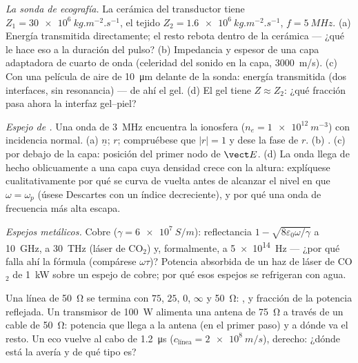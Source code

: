 \begin{exercise}[$\star\star$]\label{exo:b2:wave-interfaces:6}
\emph{La sonda de ecografía.} La cerámica del transductor tiene $Z_1 = \qty{30e6}{kg.m^{-2}.s^{-1}}$,
el tejido $Z_2 = \qty{1.6e6}{kg.m^{-2}.s^{-1}}$, $f = \qty{5}{MHz}$. (a) Energía
transmitida directamente; el resto rebota dentro de la cerámica --- ¿qué
le hace eso a la duración del pulso? (b) Impedancia y espesor de una
capa adaptadora de cuarto de onda (celeridad del sonido en la capa, \qty{3000}{m/s}).
(c) Con una película de aire de \qty{10}{\micro m} delante de la sonda: energía
transmitida (dos interfaces, sin resonancia) --- de ahí el gel. (d) El
gel tiene $Z \approx Z_2$: ¿qué fracción pasa ahora la interfaz gel--piel?
\end{exercise}

\begin{exercise}[$\star\star$]\label{exo:b2:wave-interfaces:7}
\emph{Espejo de .} Una onda de \qty{3}{MHz} encuentra la ionosfera ($n_e =
\qty{1e12}{m^{-3}}$) con incidencia normal. (a) $\underline n$; $r$; compruébese que $|r| = 1$ y
dese la fase de $r$. (b) . (c)  por debajo de la
capa: posición del primer nodo de $\vect E$. (d) La onda llega de hecho
oblicuamente a una capa cuya densidad crece con la altura: explíquese
cualitativamente por qué se curva de vuelta antes de alcanzar el nivel en que
$\omega = \omega_p$ (úsese Descartes con un índice decreciente), y por qué una onda de
frecuencia más alta escapa.
\end{exercise}

\begin{exercise}[$\star\star$]\label{exo:b2:wave-interfaces:8}
\emph{Espejos metálicos.} Cobre ($\gamma = \qty{6e7}{S/m}$): reflectancia $1 -
\sqrt{8\varepsilon_0\omega/\gamma}$ a \qty{10}{GHz}, a \qty{30}{THz} (láser de CO$_2$) y,
formalmente, a \qty{5e14}{Hz} --- ¿por qué falla ahí la fórmula (compárese
$\omega\tau$)? Potencia absorbida de un haz de láser de CO$_2$ de \qty{1}{kW} sobre un espejo
de cobre; por qué esos espejos se refrigeran con agua.
\end{exercise}

\begin{exercise}[$\star\star$]\label{exo:b2:wave-interfaces:9}
Una línea de \qty{50}{\ohm} se termina con $75$, $25$, $0$, $\infty$ y \qty{50}{\ohm}:
,  y fracción de la potencia
reflejada. Un transmisor de \qty{100}{W} alimenta una antena de \qty{75}{\ohm}
a través de un cable de \qty{50}{\ohm}: potencia que llega a la antena (en el primer paso)
y a dónde va el resto. Un eco vuelve al cabo de \qty{1.2}{\micro s} ($c_{\text{línea}}
= \qty{2e8}{m/s}$), derecho: ¿dónde está la avería y de qué tipo es?
\end{exercise}

